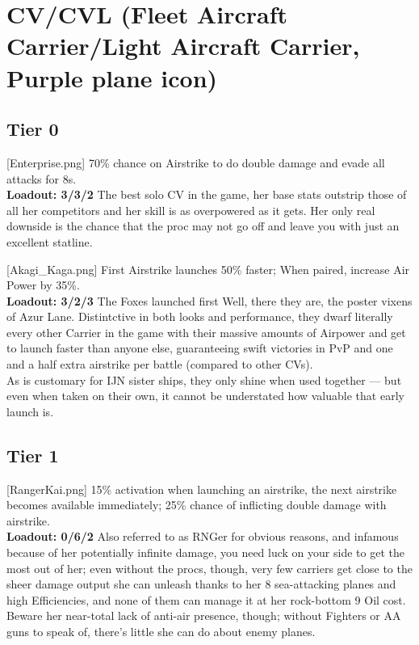  
\newpage
\section[CV/CVL]{CV/CVL (Fleet Aircraft Carrier/Light Aircraft Carrier, Purple plane icon)}
\subsection{Tier 0}
[Enterprise.png]
{70\% chance on Airstrike to do double damage and evade all attacks for 8s.\\
\textbf{Loadout: 3/3/2}}
{}
{The best solo CV in the game, her base stats outstrip those of all her competitors and her skill is as overpowered as it gets. Her only real downside is the chance that the proc may not go off and leave you with just an excellent statline.}
 
[Akagi_Kaga.png]
{First Airstrike launches 50\% faster; When paired, increase Air Power by 35\%.\\
\textbf{Loadout: 3/2/3}}
{The Foxes launched first}
{Well, there they are, the poster vixens of Azur Lane. Distintctive in both looks and performance, they dwarf literally every other Carrier in the game with their massive amounts of Airpower and get to launch faster than anyone else, guaranteeing swift victories in PvP and one and a half extra airstrike per battle (compared to other CVs).\\
As is customary for IJN sister ships, they only shine when used together --- but even when taken on their own, it cannot be understated how valuable that early launch is.}
 
 
\newpage
\subsection{Tier 1}
[RangerKai.png]
{15\% activation when launching an airstrike, the next airstrike becomes available immediately; 25\% chance of inflicting double damage with airstrike.\\
\textbf{Loadout: 0/6/2}}
{}
{Also referred to as RNGer for obvious reasons, and infamous because of her potentially infinite damage, you need luck on your side to get the most out of her; even without the procs, though, very few carriers get close to the sheer damage output she can unleash thanks to her 8 sea-attacking planes and high Efficiencies, and none of them can manage it at her rock-bottom 9 Oil cost.\\
Beware her near-total lack of anti-air presence, though; without Fighters or AA guns to speak of, there's little she can do about enemy planes.}

